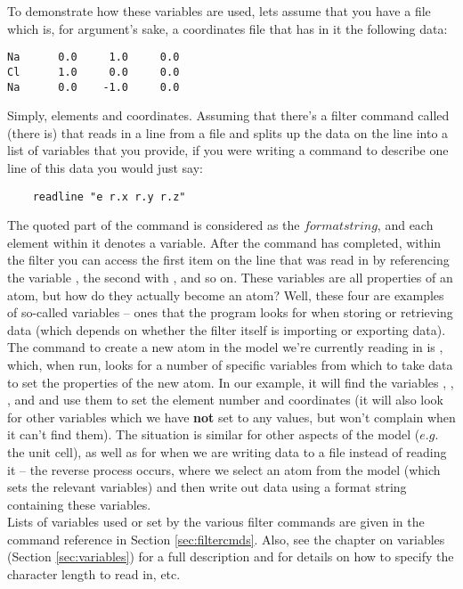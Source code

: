 To demonstrate how these variables are used, lets assume that you have a file which is, for argument's sake, a coordinates file that has in it the following data:

\begin{verbatim}
Na      0.0     1.0     0.0
Cl      1.0     0.0     0.0
Na      0.0    -1.0     0.0
\end{verbatim}

Simply, elements and coordinates. Assuming that there's a filter command called  (there is) that reads in a line from a file and splits up the data on the line into a list of variables that you provide, if you were writing a command to describe one line of this data you would just say:

\begin{verbatim}
	readline "e r.x r.y r.z"
\end{verbatim}

The quoted part of the command is considered as the $format string$, and each element within it denotes a variable. After the command has completed, within the filter you can access the first item on the line that was read in by referencing the variable , the second with , and so on. These variables are all properties of an atom, but how do they actually become an atom? Well, these four are examples of so-called  variables -- ones that the program looks for when storing or retrieving data (which depends on whether the filter itself is importing or exporting data). The command to create a new atom in the model we're currently reading in is , which, when run, looks for a number of specific variables from which to take data to set the properties of the new atom. In our example, it will find the variables , , , and  and use them to set the element number and coordinates (it will also look for other variables which we have \textbf{not} set to any values, but won't complain when it can't find them). The situation is similar for other aspects of the model ($e.g.$ the unit cell), as well as for when we are writing data to a file instead of reading it -- the reverse process occurs, where we select an atom from the model (which sets the relevant variables) and then write out data using a format string containing these variables. \\

Lists of variables used or set by the various filter commands are given in the command reference in Section \ref{sec:filtercmds}. Also, see the chapter on variables (Section \ref{sec:variables}) for a full description and for details on how to specify the character length to read in, etc.


